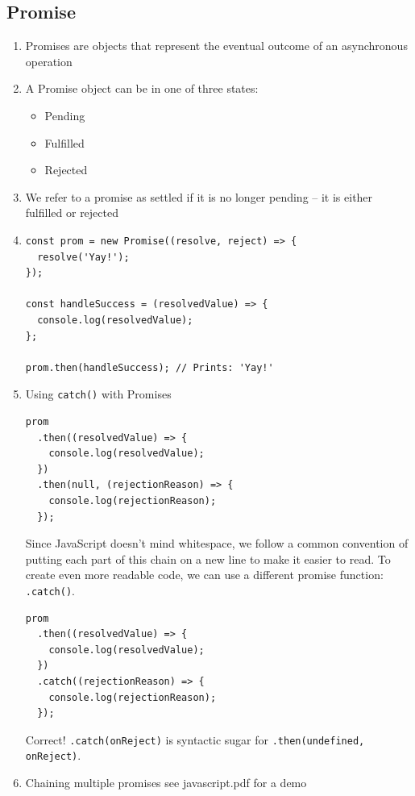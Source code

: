 \documentclass[a4paper, 12pt]{article}
\begin{document}
\subsection{Promise}
\begin{enumerate}

\item Promises are objects that represent the eventual outcome of an asynchronous operation

\item A Promise object can be in one of three states:
\begin{itemize}
\item Pending
\item Fulfilled
\item Rejected
\end{itemize}

\item We refer to a promise as settled if it is no longer pending -- it is either fulfilled or rejected

\item \begin{verbatim}
const prom = new Promise((resolve, reject) => {
  resolve('Yay!');
});

const handleSuccess = (resolvedValue) => {
  console.log(resolvedValue);
};

prom.then(handleSuccess); // Prints: 'Yay!'
\end{verbatim}

\item Using \verb|catch()| with Promises
\begin{verbatim}
prom
  .then((resolvedValue) => {
    console.log(resolvedValue);
  })
  .then(null, (rejectionReason) => {
    console.log(rejectionReason);
  });
\end{verbatim}
Since JavaScript doesn't mind whitespace, we follow a common convention of putting each part of this chain on a new line to make it easier to read. To create even more readable code, we can use a different promise function: \verb|.catch()|.
\begin{verbatim}
prom
  .then((resolvedValue) => {
    console.log(resolvedValue);
  })
  .catch((rejectionReason) => {
    console.log(rejectionReason);
  });
\end{verbatim}

Correct! \verb|.catch(onReject)| is syntactic sugar for \verb|.then(undefined, onReject)|.

\item Chaining multiple promises see javascript.pdf for a demo


\end{enumerate}
\end{document}
